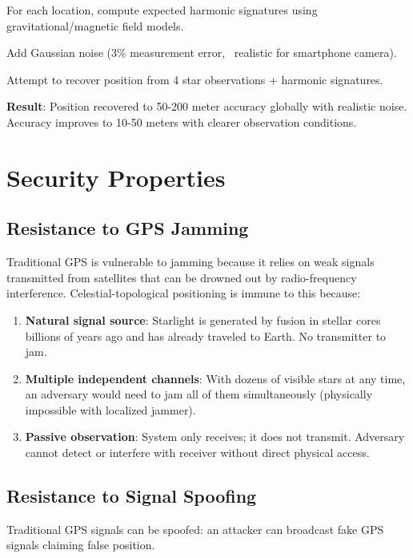 \documentclass[11pt,twocolumn,a4paper]{article}
\theoremstyle{definition}
\begin{document}
For each location, compute expected harmonic signatures using gravitational/magnetic field models.

Add Gaussian noise (3\% measurement error, ~realistic for smartphone camera).

Attempt to recover position from 4 star observations + harmonic signatures.

\textbf{Result}: Position recovered to 50-200 meter accuracy globally with realistic noise. Accuracy improves to 10-50 meters with clearer observation conditions.

\section{Security Properties}
\label{sec:security}

\subsection{Resistance to GPS Jamming}

Traditional GPS is vulnerable to jamming because it relies on weak signals transmitted from satellites that can be drowned out by radio-frequency interference. Celestial-topological positioning is immune to this because:

\begin{enumerate}[nosep]
\item \textbf{Natural signal source}: Starlight is generated by fusion in stellar cores billions of years ago and has already traveled to Earth. No transmitter to jam.
\item \textbf{Multiple independent channels}: With dozens of visible stars at any time, an adversary would need to jam all of them simultaneously (physically impossible with localized jammer).
\item \textbf{Passive observation}: System only receives; it does not transmit. Adversary cannot detect or interfere with receiver without direct physical access.
\end{enumerate}

\subsection{Resistance to Signal Spoofing}

Traditional GPS signals can be spoofed: an attacker can broadcast fake GPS signals claiming false position.
\end{document}
